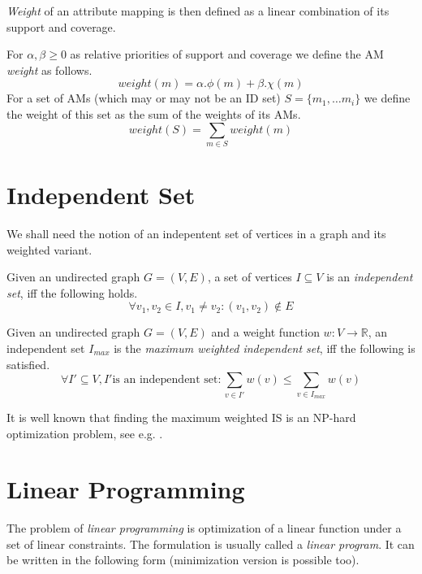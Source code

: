 \textit{Weight} of an attribute mapping is then defined as a linear combination of its support and coverage.

\begin{define}[Weight]
For $\alpha, \beta \geq 0$ as relative priorities of support and coverage we define the AM \textit{weight} as follows.
\[weight(m) = \alpha . \phi(m) + \beta . \chi(m)\]
For a set of AMs (which may or may not be an ID set) $S = \{m_1, \ldots m_i\}$ we define the weight of this set as the sum of the weights of its AMs.
\[weight(S) = \sum_{m \in S} weight(m)\]
\end{define}

\section{Independent Set}
\label{section-definitions-is}

We shall need the notion of an indepentent set of vertices in a graph and its weighted variant.

\begin{define}
Given an undirected graph $G = (V, E)$, a set of vertices $I \subseteq V$ is an \textit{independent set}, iff the following holds.
\[\forall v_1, v_2 \in I, v_1 \neq v_2: (v_1, v_2) \notin E \]
\end{define}

\begin{define}
Given an undirected graph $G = (V, E)$ and a weight function $w: V \rightarrow \mathbb{R}$, an independent set $I_{max}$ is the \textit{maximum weighted independent set}, iff the following is satisfied.
\[\forall I' \subseteq V, I' \text{is an independent set}: \sum_{v \in I'} w(v) \leqslant \sum_{v \in I_{max}} w(v)\]
\end{define}

It is well known that finding the maximum weighted IS is an NP-hard optimization problem, see e.g. \cite{JM1986425}.

\section{Linear Programming}

The problem of \textit{linear programming} is optimization of a linear function under a set of linear constraints. The formulation is usually called a \textit{linear program}. It can be written in the following form (minimization version is possible too).

